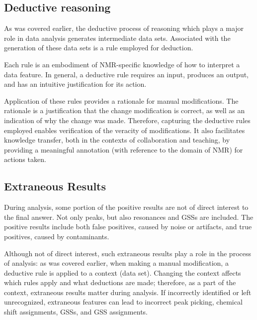 
\subsection{Deductive reasoning}
As was covered earlier, the deductive process of reasoning which plays
a major role in data analysis generates intermediate data sets.  Associated
with the generation of these data sets is a rule employed for deduction.

Each rule is an embodiment of NMR-specific knowledge of how to interpret a
data feature.  In general, a deductive rule requires an input, produces an
output, and has an intuitive justification for its action.  

Application of these rules provides a rationale for manual modifications.  The
rationale is a justification that the change modification is correct, as
well as an indication of why the change was made.  Therefore, capturing the
deductive rules employed enables verification of the veracity of modifications. 
It also facilitates knowledge transfer, both in the contexts of collaboration
and teaching, by providing a meaningful annotation (with reference to the
domain of NMR) for actions taken.

\subsection{Extraneous Results}
During analysis, some portion of the positive results are not of direct interest
to the final answer.  Not only peaks, but also resonances and GSSs are included.
The positive results include both false positives, caused by noise or
artifacts, and true positives, caused by contaminants.

Although not of direct interest, such extraneous results play a role in 
the process of analysis: as was covered earlier, when making a manual
modification, a deductive rule is applied to a context (data set).  Changing 
the context affects which rules apply and what deductions are made; 
therefore, as a part of the context, extraneous results matter during analysis. 
If incorrectly identified or left unrecognized, extraneous features can
lead to incorrect peak picking, chemical shift assignments, GSSs, and GSS
assignments.

